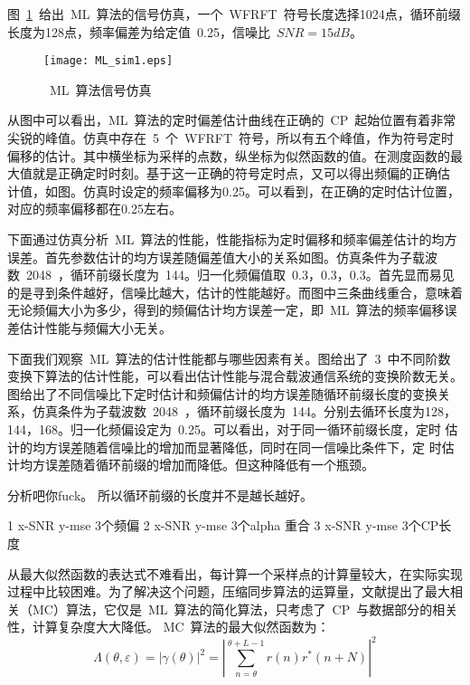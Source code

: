 图~\ref{ML_sim1}~给出~ML~算法的信号仿真，一个~WFRFT~符号长度选择1024点，循环前缀长度为128点，频率偏差为给定值~0.25，信噪比~$SNR=15dB$。
\begin{figure}[htbp]
\centering
\texttt{[image: ML\_sim1.eps]}
\caption{~ML~算法信号仿真}\vspace{-1em}\label{ML_sim1}
\end{figure}
从图中可以看出，ML~算法的定时偏差估计曲线在正确的~CP~起始位置有着非常尖锐的峰值。仿真中存在~5~个~WFRFT~符号，所以有五个峰值，作为符号定时偏移的估计。其中横坐标为采样的点数，纵坐标为似然函数的值。在测度函数的最大值就是正确定时时刻。基于这一正确的符号定时点，又可以得出频偏的正确估
计值，如图。仿真时设定的频率偏移为0.25。可以看到，在正确的定时估计位置，对应的频率偏移都在0.25左右。

下面通过仿真分析~ML~算法的性能，性能指标为定时偏移和频率偏差估计的均方误差。首先参数估计的均方误差随偏差值大小的关系如图。仿真条件为子载波数~2048~，循环前缀长度为~144。归一化频偏值取~0.3，0.3，0.3。首先显而易见的是寻到条件越好，信噪比越大，估计的性能越好。而图中三条曲线重合，意味着无论频偏大小为多少，得到的频偏估计均方误差一定，即~ML~算法的频率偏移误差估计性能与频偏大小无关。

下面我们观察~ML~算法的估计性能都与哪些因素有关。图给出了~3~中不同阶数变换下算法的估计性能，可以看出估计性能与混合载波通信系统的变换阶数无关。图给出了不同信噪比下定时估计和频偏估计的均方误差随循环前缀长度的变换关系，仿真条件为子载波数~2048~，循环前缀长度为~144。分别去循环长度为128，144，168。归一化频偏设定为~0.25。可以看出，对于同一循环前缀长度，定时
估计的均方误差随着信噪比的增加而显著降低，同时在同一信噪比条件下，定
时估计均方误差随着循环前缀的增加而降低。但这种降低有一个瓶颈。

分析吧你fuck。
所以循环前缀的长度并不是越长越好。
 

1 x-SNR y-mse 3个频偏
2 x-SNR y-mse 3个alpha 重合
3 x-SNR y-mse 3个CP长度 










从最大似然函数的表达式不难看出，每计算一个采样点的计算量较大，在实际实现过程中比较困难。为了解决这个问题，压缩同步算法的运算量，文献提出了最大相关（MC）算法，它仅是~ML~算法的简化算法，只考虑了~CP~与数据部分的相关性，计算复杂度大大降低。
MC~算法的最大似然函数为：
\begin{equation}
\Lambda \left( {\theta ,\varepsilon } \right) = {\left| {\gamma \left( \theta  \right)} \right|^2} = {\left| {\sum\limits_{n = \theta }^{\theta  + L - 1} {r\left( n \right){r^*}\left( {n + N} \right)} } \right|^2}
\end{equation}

